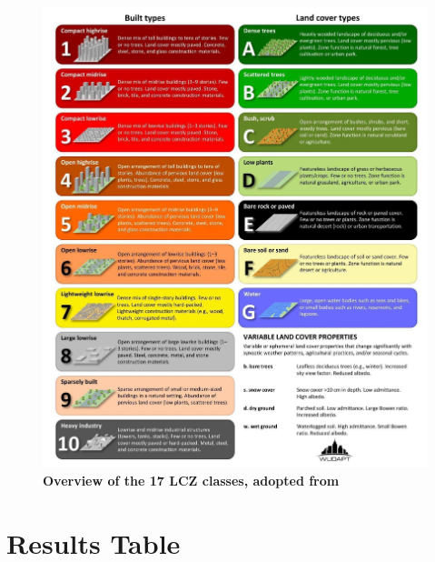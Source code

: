 \documentclass[utf8]{frontiersSCNS} %
\begin{document}
\begin{figure}
\centering
\includegraphics[trim={0 0 0 0},clip,scale=0.25]{images/image10.jpg}
\caption{\bf Overview of the 17 LCZ classes, adopted from \cite{Demuzere2022}}
 \label{fig:17lczs}
\end{figure}

\section{Results Table}\label{sec:appendix2}







\end{document}
